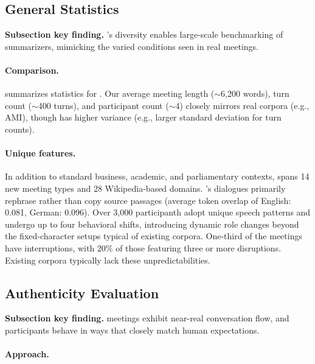 \subsection{General Statistics}
\noindent
\textbf{Subsection key finding.}
\dataset{}’s diversity enables large-scale benchmarking of summarizers, mimicking the varied conditions seen in real meetings.


\paragraph{Comparison.}

 summarizes statistics for \dataset{}.
Our average meeting length ($\sim$6,200 words), turn count ($\sim$400 turns), and participant count ($\sim$4) closely mirrors real corpora (e.g., AMI), though \dataset{} has higher variance (e.g., larger standard deviation for turn counts).




\paragraph{Unique features.}
In addition to standard business, academic, and parliamentary contexts, \dataset{} spans 14 new meeting types and 28 Wikipedia-based domains.
\dataset{}’s dialogues primarily rephrase rather than copy source passages (average token overlap of English: 0.081, German: 0.096).
Over 3,000 participanth adopt unique speech patterns and undergo up to four behavioral shifts, introducing dynamic role changes beyond the fixed-character setups typical of existing corpora.
One-third of the meetings have interruptions, with 20\% of those featuring three or more disruptions. 
Existing corpora typically lack these unpredictabilities.



\subsection{Authenticity Evaluation}
\label{sec:authenticity_eval}


\noindent
\textbf{Subsection key finding.}
\dataset{} meetings exhibit near-real conversation flow, and participants behave in ways that closely match human expectations.

\paragraph{Approach.}

